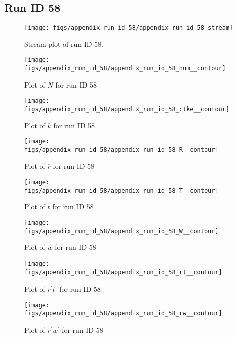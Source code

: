 \subsection{Run ID 58}
\begin{figure}[H]
\centering
\texttt{[image: figs/appendix\_run\_id\_58/appendix\_run\_id\_58\_stream]}
\caption{Stream plot of run ID 58.}
\label{fig:appendix_run_id_58_stream}
\end{figure}


\begin{figure}[H]
\centering
\texttt{[image: figs/appendix\_run\_id\_58/appendix\_run\_id\_58\_num\_\_contour]}
\caption{Plot of $N$ for run ID 58}
\label{fig:appendix_run_id_58_num__contour}
\end{figure}


\begin{figure}[H]
\centering
\texttt{[image: figs/appendix\_run\_id\_58/appendix\_run\_id\_58\_ctke\_\_contour]}
\caption{Plot of $k$ for run ID 58}
\label{fig:appendix_run_id_58_ctke__contour}
\end{figure}


\begin{figure}[H]
\centering
\texttt{[image: figs/appendix\_run\_id\_58/appendix\_run\_id\_58\_R\_\_contour]}
\caption{Plot of $\overline{r}$ for run ID 58}
\label{fig:appendix_run_id_58_R__contour}
\end{figure}


\begin{figure}[H]
\centering
\texttt{[image: figs/appendix\_run\_id\_58/appendix\_run\_id\_58\_T\_\_contour]}
\caption{Plot of $\overline{t}$ for run ID 58}
\label{fig:appendix_run_id_58_T__contour}
\end{figure}


\begin{figure}[H]
\centering
\texttt{[image: figs/appendix\_run\_id\_58/appendix\_run\_id\_58\_W\_\_contour]}
\caption{Plot of $\overline{w}$ for run ID 58}
\label{fig:appendix_run_id_58_W__contour}
\end{figure}


\begin{figure}[H]
\centering
\texttt{[image: figs/appendix\_run\_id\_58/appendix\_run\_id\_58\_rt\_\_contour]}
\caption{Plot of $\overline{r^\prime t^\prime}$ for run ID 58}
\label{fig:appendix_run_id_58_rt__contour}
\end{figure}


\begin{figure}[H]
\centering
\texttt{[image: figs/appendix\_run\_id\_58/appendix\_run\_id\_58\_rw\_\_contour]}
\caption{Plot of $\overline{r^\prime w^\prime}$ for run ID 58}
\label{fig:appendix_run_id_58_rw__contour}
\end{figure}


